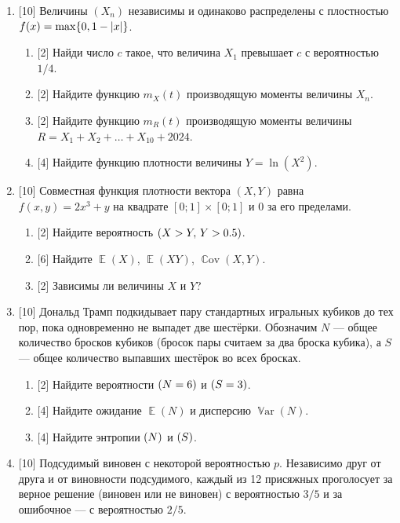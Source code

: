 \documentclass[12pt]{article}
\DeclareMathOperator{\Cov}{\mathbb{C}ov}
\DeclareMathOperator{\Var}{\mathbb{V}ar}
\let\P\relax
\DeclareMathOperator{\P}{\mathbb{P}}
\let\H\relax
\DeclareMathOperator{\H}{\mathbb{H}}
\DeclareMathOperator{\E}{\mathbb{E}}
\DeclarePairedDelimiter{\abs}{\lvert}{\rvert}
\begin{document}
\begin{enumerate}
    \item {[10]} Величины $(X_n)$ независимы и одинаково распределены с плостностью $f(x) = \max\{0, 1 - \abs{x}\}$.
    \begin{enumerate}
        \item {[2]} Найди число $c$ такое, что величина $X_1$ превышает $c$ с вероятностью $1/4$.
        \item {[2]} Найдите функцию $m_X(t)$ производящую моменты величины $X_n$.
        \item {[2]} Найдите функцию $m_R(t)$ производящую моменты величины $R = X_1 + X_2 + \dots + X_{10} + 2024$.
        \item {[4]} Найдите функцию плотности величины $Y = \ln (X^2)$.
    \end{enumerate}
    \item {[10]} Совместная функция плотности вектора $(X, Y)$ равна $f(x, y) = 2x^3 + y$ на квадрате $[0;1] \times [0;1]$ и $0$ за его пределами. 
    \begin{enumerate}
        \item {[2]} Найдите вероятность $\P(X > Y,\, Y > 0.5)$. 
        \item {[6]} Найдите $\E(X)$, $\E(XY)$, $\Cov(X, Y)$.
        \item {[2]} Зависимы ли величины $X$ и $Y$?
    \end{enumerate}
    
    \item {[10]} Дональд Трамп подкидывает пару стандартных игральных кубиков до тех пор, пока одновременно не выпадет две шестёрки.
    Обозначим $N$ — общее количество бросков кубиков (бросок пары считаем за два броска кубика), а $S$ — общее количество выпавших шестёрок во всех бросках. 
    \begin{enumerate}
        \item {[2]} Найдите вероятности $\P(N = 6)$ и $\P(S = 3)$.
        \item {[4]} Найдите ожидание $\E(N)$ и дисперсию $\Var(N)$.
        \item {[4]} Найдите энтропии $\H(N)$ и $\H(S)$.
    \end{enumerate}
    \item {[10]} Подсудимый виновен с некоторой вероятностью $p$.
    Независимо друг от друга и от виновности подсудимого, каждый из 12 присяжных проголосует за верное решение (виновен или не виновен) с вероятностью $3/5$
    и за ошибочное — с вероятностью $2/5$.


\end{enumerate}
\end{document}
